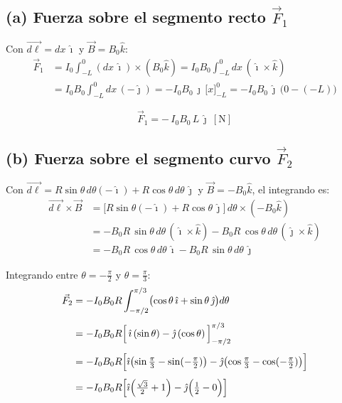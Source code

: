 \documentclass[12pt,letterpaper]{article}
\begin{document}
\bigskip

\subsection*{(a) Fuerza sobre el segmento recto $\vec{F}_1$}

Con $\vec{d\ell}=dx\,\hat{\imath}$ y $\vec{B}=B_0\hat{k}$:
\begin{align*}
    \vec{F}_1 &= I_0\int_{-L}^{0} (dx\,\hat{\imath})\times(B_0\hat{k})
             = I_0 B_0 \int_{-L}^{0} dx\,(\hat{\imath}\times\hat{k}) \\[4pt]
            &= I_0 B_0 \int_{-L}^{0} dx\,(-\hat{\jmath})
             = -I_0 B_0\,\hat{\jmath}\,\bigl[x\bigr]_{-L}^{0}
             = -I_0 B_0\,\hat{\jmath}\,\bigl(0-(-L)\bigr)
\end{align*}

\[
    \boxed{\vec{F}_1 = -\,I_0 B_0\,L\,\hat{\jmath}\ [\text{N}]}
\]

\bigskip

\subsection*{(b) Fuerza sobre el segmento curvo $\vec{F}_2$}

Con $\vec{d\ell}=R\sin\theta\,d\theta(-\hat{\imath})+R\cos\theta\,d\theta\,\hat{\jmath}$
y $\vec{B}=-B_0\hat{k}$, el integrando es:
\begin{align*}
    \vec{d\ell}\times\vec{B}
      &= \bigl[R\sin\theta(-\hat{\imath})+R\cos\theta\,\hat{\jmath}\bigr]\,d\theta
         \times(-B_0\hat{k}) \\[4pt]
      &= -B_0 R\,\sin\theta\,d\theta\,(\hat{\imath}\times\hat{k})
         - B_0 R\,\cos\theta\,d\theta\,(\hat{\jmath}\times\hat{k}) \\[4pt]
      &= -B_0 R\,\cos\theta\,d\theta\,\hat{\imath}
         - B_0 R\,\sin\theta\,d\theta\,\hat{\jmath}
\end{align*}

Integrando entre $\theta=-\tfrac{\pi}{2}$ y $\theta=\tfrac{\pi}{3}$:
\begin{align*}
    \vec{F}_2 &= -I_0 B_0 R\int_{-\pi/2}^{\pi/3}
                 \bigl(\cos\theta\,\hat{\imath}+\sin\theta\,\hat{\jmath}\bigr)d\theta \\[4pt]
              &= -I_0 B_0 R\Bigl[\,\hat{\imath}\,(\sin\theta)
                 -\hat{\jmath}\,(\cos\theta)\,\Bigr]_{-\pi/2}^{\pi/3} \\[4pt]
              &= -I_0 B_0 R\Bigl[\hat{\imath}\bigl(\sin\tfrac{\pi}{3}-\sin(-\tfrac{\pi}{2})\bigr)
                 -\hat{\jmath}\bigl(\cos\tfrac{\pi}{3}-\cos(-\tfrac{\pi}{2})\bigr)\Bigr] \\[4pt]
              &= -I_0 B_0 R\Bigl[\hat{\imath}\Bigl(\tfrac{\sqrt{3}}{2}+1\Bigr)
                 -\hat{\jmath}\Bigl(\tfrac{1}{2}-0\Bigr)\Bigr]
\end{align*}
\end{document}
